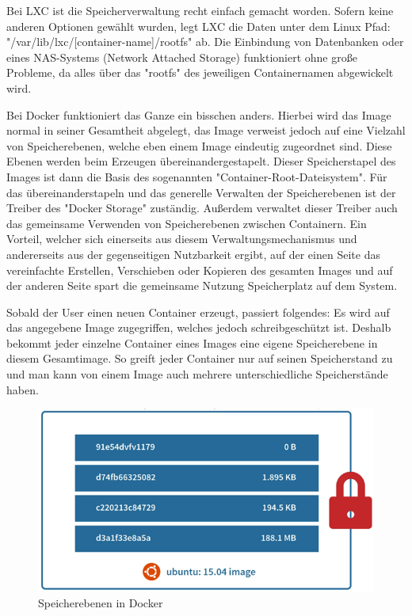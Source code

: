 
Bei LXC ist die Speicherverwaltung recht einfach gemacht worden. Sofern keine anderen Optionen gewählt wurden, legt LXC die Daten unter dem Linux Pfad: "/var/lib/lxc/[container-name]/rootfs" ab. Die Einbindung von Datenbanken oder eines NAS-Systems (Network Attached Storage) funktioniert ohne große Probleme, da alles über das "rootfs" des jeweiligen Containernamen abgewickelt wird. \cite{LxcVsDocker}

Bei Docker funktioniert das Ganze ein bisschen anders. Hierbei wird das Image normal in seiner Gesamtheit abgelegt, das Image verweist jedoch auf eine Vielzahl von Speicherebenen, welche eben einem Image eindeutig zugeordnet sind. Diese Ebenen werden beim Erzeugen übereinandergestapelt. Dieser Speicherstapel des Images ist dann die Basis des sogenannten "Container-Root-Dateisystem". Für das übereinanderstapeln und das generelle Verwalten der Speicherebenen ist der Treiber des "Docker Storage" zuständig. Außerdem verwaltet dieser Treiber auch das gemeinsame Verwenden von Speicherebenen zwischen Containern. Ein Vorteil, welcher sich einerseits aus diesem Verwaltungsmechanismus und andererseits aus der gegenseitigen Nutzbarkeit ergibt, auf der einen Seite das vereinfachte Erstellen, Verschieben oder Kopieren des gesamten Images und auf der anderen Seite spart die gemeinsame Nutzung Speicherplatz auf dem System. \cite{LxcVsDocker}

Sobald der User einen neuen Container erzeugt, passiert folgendes: Es wird auf das angegebene Image zugegriffen, welches jedoch schreibgeschützt ist. Deshalb bekommt jeder einzelne Container eines Images eine eigene Speicherebene in diesem Gesamtimage. So greift jeder Container nur auf seinen Speicherstand zu und man kann von einem Image auch mehrere unterschiedliche Speicherstände haben. \cite{LxcVsDocker}

\begin{figure}[H]
    \centering
    \includegraphics{media/DockerAndContainering/Speicherebenen.png}
    \caption{Speicherebenen in Docker \cite{LxcVsDocker}}
\end{figure}

